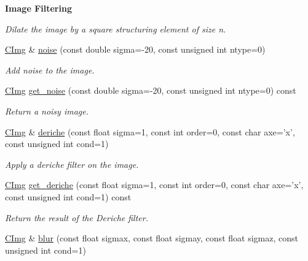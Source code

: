 \begin{Indent}{\bf Image Filtering}
\begin{DoxyCompactItemize}
\begin{DoxyCompactList}\small\item\em Dilate the image by a square structuring element of size n. \item\end{DoxyCompactList}\item 
\hyperlink{structcimg__library_1_1_c_img}{CImg} \& \hyperlink{structcimg__library_1_1_c_img_a5f9e9fa1b27d6de91703cd57f4cf2275}{noise} (const double sigma=-\/20, const unsigned int ntype=0)
\begin{DoxyCompactList}\small\item\em Add noise to the image. \item\end{DoxyCompactList}\item 
\hyperlink{structcimg__library_1_1_c_img}{CImg} \hyperlink{structcimg__library_1_1_c_img_ab47b7ed21c3ed05bd689622cd8fc6670}{get\_\-noise} (const double sigma=-\/20, const unsigned int ntype=0) const 
\begin{DoxyCompactList}\small\item\em Return a noisy image. \item\end{DoxyCompactList}\item 
\hyperlink{structcimg__library_1_1_c_img}{CImg} \& \hyperlink{structcimg__library_1_1_c_img_a5ed8c92cc96a9083b8310021cde1d37d}{deriche} (const float sigma=1, const int order=0, const char axe='x', const unsigned int cond=1)
\begin{DoxyCompactList}\small\item\em Apply a deriche filter on the image. \item\end{DoxyCompactList}\item 
\hyperlink{structcimg__library_1_1_c_img}{CImg} \hyperlink{structcimg__library_1_1_c_img_a4234c0271b48e16829fd6d29b44e792c}{get\_\-deriche} (const float sigma=1, const int order=0, const char axe='x', const unsigned int cond=1) const 
\begin{DoxyCompactList}\small\item\em Return the result of the Deriche filter. \item\end{DoxyCompactList}\item 
\hyperlink{structcimg__library_1_1_c_img}{CImg} \& \hyperlink{structcimg__library_1_1_c_img_a41a8cd61d97ca8268fcdcafc858f06f2}{blur} (const float sigmax, const float sigmay, const float sigmaz, const unsigned int cond=1)

\end{DoxyCompactItemize}
\end{Indent}
